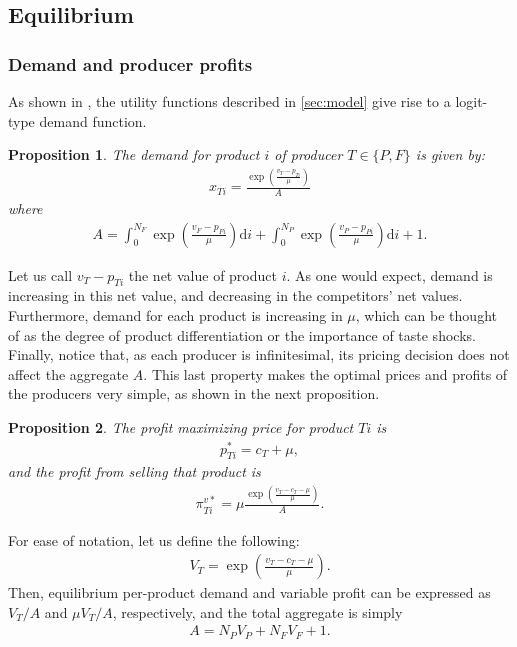 \documentclass[a4paper]{article}
\newtheorem{proposition}{Proposition}
\newcommand{\di}{\mathrm{d}i}
\begin{document}
\subsection{Equilibrium}

\subsubsection{Demand and producer profits}

As shown in \textcite[]{anderson2021hybrid}, the utility functions described in \cref{sec:model} give rise to a logit-type demand function.
\begin{proposition}
    \label{prop:demand_function}
    The demand for product $i$ of producer $T \in \{P, F\}$ is given by:
    \begin{align*}
        x_{Ti} = \frac{\exp\left( \frac{v_T - p_{Ti}}{\mu} \right)}{A}
    \end{align*}
    where
    \begin{align}
        A = \int_0^{N_F} \exp\left( \frac{v_F - p_{Fi}}{\mu} \right) \di + \int_0^{N_P} \exp\left( \frac{v_P - p_{Pi}}{\mu} \right) \di + 1.
        \label{eq:aggregate}
    \end{align}
\end{proposition}

Let us call $v_T - p_{Ti}$ the net value of product $i$.
As one would expect, demand is increasing in this net value, and decreasing in the competitors' net values.
Furthermore, demand for each product is increasing in $\mu$, which can be thought of as the degree of product differentiation or the importance of taste shocks.
Finally, notice that, as each producer is infinitesimal, its pricing decision does not affect the aggregate $A$.
This last property makes the optimal prices and profits of the producers very simple, as shown in the next proposition.
\begin{proposition}
    \label{prop:optimal_profit}
    The profit maximizing price for product $Ti$ is
    \begin{align*}
        p^*_{Ti} = c_T + \mu,
    \end{align*}
    and the profit from selling that product is
    \begin{align}
        \pi^{v*}_{Ti} = \mu \frac{\exp \left( \frac{v_T - c_T - \mu}{\mu} \right)}{A}.
        \label{eq:optimal_profit}
    \end{align}
\end{proposition}

For ease of notation, let us define the following:
\begin{align*}
    V_T = \exp \left( \frac{v_T - c_T - \mu}{\mu} \right).
\end{align*}
Then, equilibrium per-product demand and variable profit can be expressed as $V_T/ A$ and $\mu V_T/ A$, respectively, and the total aggregate is simply
\begin{align*}
    A = N_P V_P + N_F V_F + 1.
\end{align*}
\end{document}
